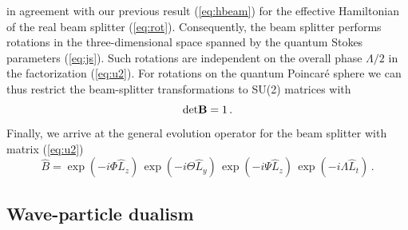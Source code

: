 \documentclass[12pt,amsmath,amssymb]{article}
\def\underline#1{{\bf #1}}
\numberwithin{equation}{section}
\begin{document}
in agreement with our previous result (\ref{eq:hbeam}) for the effective
Hamiltonian of the real beam splitter (\ref{eq:rot}).
Consequently, the beam splitter performs rotations in the three-dimensional
space spanned by the quantum Stokes parameters (\ref{eq:js}).
Such rotations are independent on the overall phase $\Lambda/2$
in the factorization (\ref{eq:u2}).
For rotations on the quantum Poincar\'e sphere we can thus restrict
the beam-splitter transformations to SU(2) matrices \cite{Cornwell}
with
\begin{equation}
\mathrm{det}\underline{B} = 1\,.
\end{equation}
Finally,
we arrive at the general evolution operator for the beam splitter with
matrix (\ref{eq:u2})
\begin{equation}
\hat{B} = \exp(-i\Phi\hat{L}_z)\, \exp(-i\Theta\hat{L}_y)\,
\exp(-i\Psi\hat{L}_z)\, \exp(-i\Lambda\hat{L}_t)\,.
\end{equation}

\subsection{Wave-particle dualism}
\end{document}
